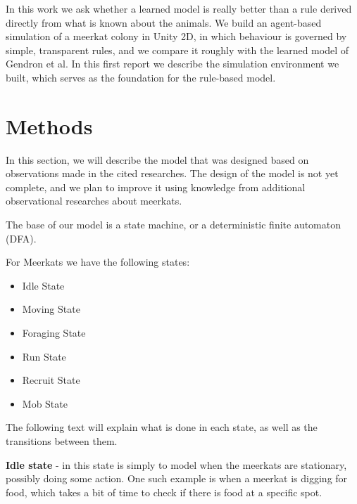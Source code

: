 \documentclass[9pt,twoside]{pnas-new}
\begin{document}
In this work we ask whether a learned model is really better than a rule derived directly from what is known about the animals. We build an agent-based simulation of a meerkat colony in Unity 2D, in which behaviour is governed by simple, transparent rules, and we compare it roughly with the learned model of Gendron et al. In this first report we describe the simulation environment we built, which serves as the foundation for the rule-based model.


\section{Methods}

\label{model-design}
In this section, we will describe the model that was designed based on observations made in the cited researches. 
The design of the model is not yet complete, and we plan to improve it using knowledge from additional observational researches about meerkats.

The base of our model is a state machine, or a deterministic finite automaton (DFA).

For Meerkats we have the following states:
\begin{itemize}
    \item Idle State
    \item Moving State
    \item Foraging State
    \item Run State
    \item Recruit State
    \item Mob State
\end{itemize}

The following text will explain what is done in each state, as well as the transitions between them.

\textbf{Idle state} - in this state is simply to model when the meerkats are stationary, possibly doing some action. One such example is when a meerkat is digging for food, which takes a bit of time to check if there is food at a specific spot.
\end{document}
